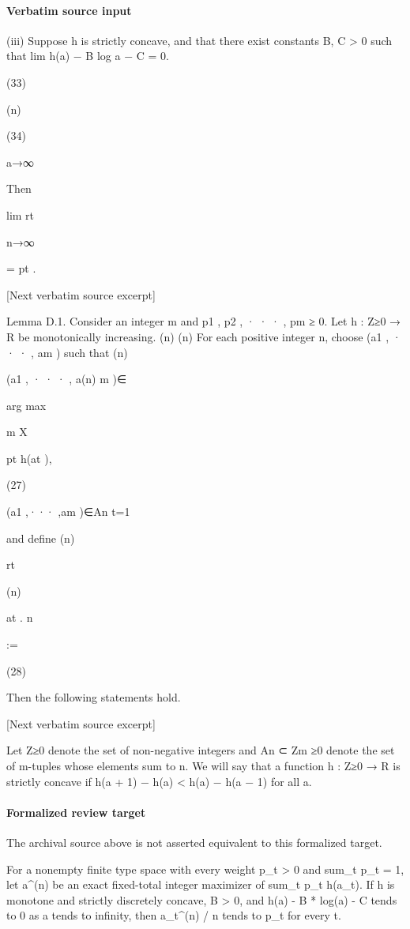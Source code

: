 \documentclass[10pt]{article}
\begin{document}
\paragraph{Verbatim source input}
\begin{ReviewVerbatim}
(iii) Suppose h is strictly concave, and that there exist constants B, C > 0 such that
lim h(a) − B log a − C = 0.

(33)

(n)

(34)

a→∞

Then

lim rt

n→∞

= pt .

[Next verbatim source excerpt]

Lemma D.1. Consider an integer m and p1 , p2 , · · · , pm ≥ 0. Let h : Z≥0 → R be monotonically increasing.
(n)
(n)
For each positive integer n, choose (a1 , · · · , am ) such that
(n)

(a1 , · · · , a(n)
m )∈

arg max

m
X

pt h(at ),

(27)

(a1 ,··· ,am )∈An t=1

and define
(n)

rt

(n)

at
.
n

:=

(28)

Then the following statements hold.

[Next verbatim source excerpt]

Let Z≥0 denote the set of non-negative integers and An ⊂ Zm
≥0 denote the set of m-tuples whose elements
sum to n. We will say that a function h : Z≥0 → R is strictly concave if h(a + 1) − h(a) < h(a) − h(a − 1)
for all a.
\end{ReviewVerbatim}


\paragraph{Formalized review target}
The archival source above is not asserted equivalent to this formalized target.
\begin{ReviewVerbatim}
For a nonempty finite type space with every weight p_t > 0 and sum_t p_t = 1, let a^(n) be an exact fixed-total integer maximizer of sum_t p_t h(a_t). If h is monotone and strictly discretely concave, B > 0, and h(a) - B * log(a) - C tends to 0 as a tends to infinity, then a_t^(n) / n tends to p_t for every t.
\end{ReviewVerbatim}
\end{document}
